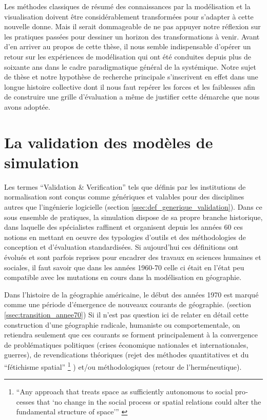 Les méthodes classiques de résumé des connaissances par la modélisation et la visualisation doivent être considérablement transformées pour s’adapter à cette nouvelle donne. Mais il serait dommageable de ne pas appuyer notre réflexion sur les pratiques passées pour dessiner un horizon des transformations à venir. Avant d’en arriver au propos de cette thèse, il nous semble indispensable d’opérer un retour sur les expériences de modélisation qui ont été conduites depuis plus de soixante ans dans le cadre paradigmatique général de la systémique. Notre sujet de thèse et notre hypothèse de recherche principale s’inscrivent en effet dans une longue histoire collective dont il nous faut repérer les forces et les faiblesses afin de construire une grille d'évaluation a même de justifier cette démarche que nous avons adoptée.



\section{La validation des modèles de simulation}
\label{sec:constante_problematique}

Les termes \enquote{Validation \& Verification} tels que définis par les institutions de normalisation sont conçus comme génériques et valables pour des disciplines autres que l'ingénierie logicielle (section \ref{ssec:def_generique_validation}). Dans ce sous ensemble de pratiques, la simulation dispose de sa propre branche historique, dans laquelle des spécialistes raffinent et organisent depuis les années 60 ces notions en mettant en oeuvre des typologies d'outils et des méthodologies de conception et d'évaluation standardisées. \autocite{Nance2002} Si aujourd'hui ces définitions ont évolués et sont parfois reprises pour encadrer des travaux en sciences humaines et sociales, il faut savoir que dans les années 1960-70 celle ci était en l'état peu compatible avec les mutations en cours dans la modélisation en géographie.

Dans l'histoire de la géographie américaine, le début des années 1970 est marqué comme une période d'émergence de nouveaux courants de géographie. (section \ref{ssec:transition_annee70}) Si il n'est pas question ici de relater en détail cette construction d'une géographie radicale, humaniste ou comportementale, on retiendra seulement que ces courants se forment principalement à la convergence de problématiques politiques (crises économique nationales et internationales, guerres), de revendications théoriques (rejet des méthodes quantitatives et du \enquote{fétichisme spatial} \footnote{\foreignquote{english}{Any approach that treats space as sufficiently autonomous to social processes that ‘no change in the social process or spatial relations could alter the fundamental structure of space’} \autocite[712]{Gregory2009}} ) et/ou méthodologiques (retour de l’herméneutique).

